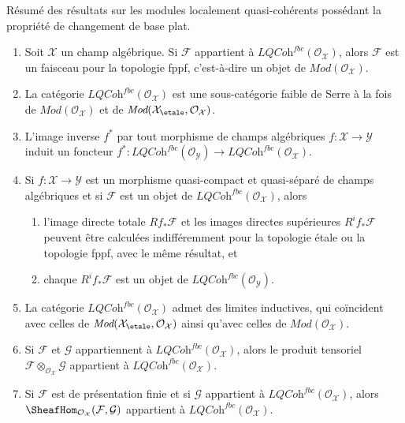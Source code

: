 \begin{proposition}
\label{proposition-loc-qcoh-flat-base-change}
Résumé des résultats sur les modules localement quasi-cohérents possédant la propriété de
changement de base plat.
\begin{enumerate}
\item Soit $\mathcal{X}$ un champ algébrique.
Si $\mathcal{F}$ appartient à $\textit{LQCoh}^{fbc}(\mathcal{O}_\mathcal{X})$,
alors $\mathcal{F}$ est un faisceau pour la topologie fppf, c'est-à-dire
un objet de $\textit{Mod}(\mathcal{O}_\mathcal{X})$.
\item La catégorie $\textit{LQCoh}^{fbc}(\mathcal{O}_\mathcal{X})$
est une sous-catégorie faible de Serre à la fois de $\textit{Mod}(\mathcal{O}_\mathcal{X})$
et de $\textit{Mod}(\mathcal{X}_\etale, \mathcal{O}_\mathcal{X})$.
\item L'image inverse $f^*$ par tout morphisme de champs algébriques
$f : \mathcal{X} \to \mathcal{Y}$ induit un foncteur
$f^* : \textit{LQCoh}^{fbc}(\mathcal{O}_\mathcal{Y}) \to
\textit{LQCoh}^{fbc}(\mathcal{O}_\mathcal{X})$.
\item Si $f : \mathcal{X} \to \mathcal{Y}$ est un morphisme
quasi-compact et quasi-séparé de champs algébriques
et si $\mathcal{F}$ est un objet de
$\textit{LQCoh}^{fbc}(\mathcal{O}_\mathcal{X})$, alors
\begin{enumerate}
\item l'image directe totale $Rf_*\mathcal{F}$ et les images directes
supérieures $R^if_*\mathcal{F}$ peuvent être calculées indifféremment pour la topologie étale ou
la topologie fppf, avec le même résultat, et
\item chaque $R^if_*\mathcal{F}$ est un objet de
$\textit{LQCoh}^{fbc}(\mathcal{O}_\mathcal{Y})$.
\end{enumerate}
\item La catégorie $\textit{LQCoh}^{fbc}(\mathcal{O}_\mathcal{X})$ admet des
limites inductives, qui coïncident avec celles de
$\textit{Mod}(\mathcal{X}_\etale, \mathcal{O}_\mathcal{X})$
ainsi qu'avec celles de $\textit{Mod}(\mathcal{O}_\mathcal{X})$.
\item Si $\mathcal{F}$ et $\mathcal{G}$ appartiennent à
$\textit{LQCoh}^{fbc}(\mathcal{O}_\mathcal{X})$, alors le produit tensoriel
$\mathcal{F} \otimes_{\mathcal{O}_\mathcal{X}} \mathcal{G}$
appartient à $\textit{LQCoh}^{fbc}(\mathcal{O}_\mathcal{X})$.
\item Si $\mathcal{F}$ est de présentation finie et si $\mathcal{G}$ appartient à
$\textit{LQCoh}^{fbc}(\mathcal{O}_\mathcal{X})$, alors
$\SheafHom_{\mathcal{O}_\mathcal{X}}(\mathcal{F}, \mathcal{G})$
appartient à $\textit{LQCoh}^{fbc}(\mathcal{O}_\mathcal{X})$.
\end{enumerate}
\end{proposition}

